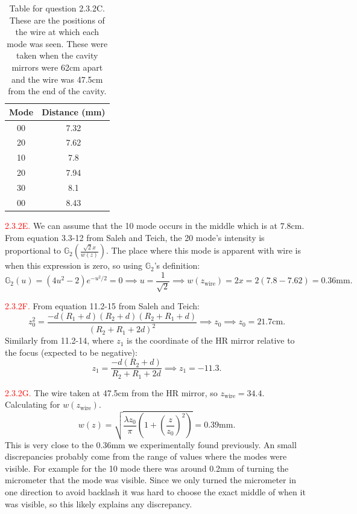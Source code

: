 \documentclass[letterpaper, reqno,11pt]{article}
\begin{document}
\begin{table}[htpb]
    \centering
    \caption{Table for question 2.3.2C. These are the positions of the wire at which each mode was seen. These were taken when the cavity mirrors were 62cm apart and the wire was 47.5cm from the end of the cavity.}
    \label{tab:label}
    \begin{tabular}{|c|c|}
    \hline
    Mode&Distance (mm)\\
    \hline
    00&7.32\\
    20&7.62\\
    10&7.8\\
    20&7.94\\
    30&8.1\\
    00&8.43\\
    \hline
    \end{tabular}
\end{table}

\noindent \textcolor{red}{2.3.2E.} We can assume that the 10 mode occurs in the middle which is at $7.8$cm. From equation 3.3-12 from Saleh and Teich, the 20 mode's intensity is proportional to $\mathbb G_{2}\left(\frac{\sqrt{2}x}{w(z)}\right)$. The place where this mode is apparent with wire is when this expression is zero, so using $\mathbb G_2$'s definition:
\[
\mathbb G_2(u)=(4u^2-2)e^{-u^2 /2}=0\implies u=\frac{1}{\sqrt{2}}\implies w(z_{\text{wire}})=2x=2\left( 7.8-7.62 \right) =0.36\text{mm}
.\]

\noindent \textcolor{red}{2.3.2F.} From equation 11.2-15 from Saleh and Teich:
\[
z_0^2= \frac{-d(R_1+d)(R_2+d)(R_2+R_1+d)}{\left( R_2+R_1+2d \right) ^2}\implies z_0\implies z_0=21.7\text{cm}
.\]
Similarly from 11.2-14, where $z_1$ is the coordinate of the HR mirror relative to the focus (expected to be negative):
\[
z_1= \frac{-d(R_2+d)}{R_2+R_1+2d}\implies z_1=-11.3
.\]

\noindent \textcolor{red}{2.3.2G.} The wire taken at 47.5cm from the HR mirror, so $z_\text{wire}=34.4$. Calculating for $w(z_{\text{wire}})$.
\[
w(z)=\sqrt{\frac{\lambda z_0}{\pi}\left( 1+\left( \frac{z}{z_0} \right) ^2 \right) }=0.39\text{mm}
.\]
This is very close to the 0.36mm we experimentally found previously. An small discrepancies probably come from the range of values where the modes were visible. For example for the 10 mode there was around 0.2mm of turning the micrometer that the mode was visible. Since we only turned the micrometer in one direction to avoid backlash it was hard to choose the exact middle of when it was visible, so this likely explains any discrepancy.
\end{document}
